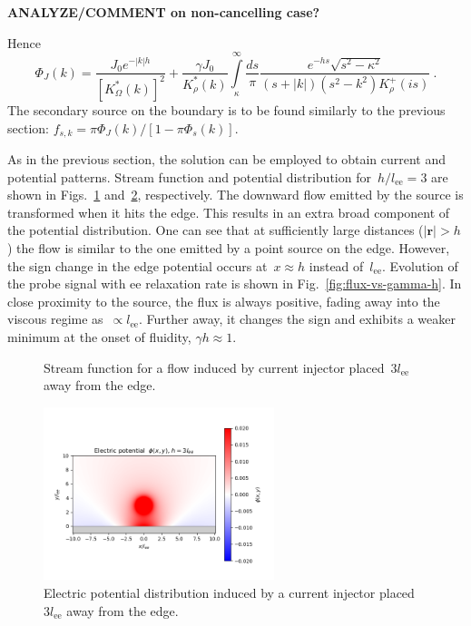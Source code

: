 \documentclass[preprint,aps,eqsecnum]{revtex4-1}
\newcommand{\fplus}[1]{{#1}^{+}}
\begin{document}
{\bf ANALYZE/COMMENT on non-cancelling case?}

Hence
\begin{equation}
\Phi_J(k) =
 \frac{J_0 e^{-|k|h}}{\left[K_\Omega^\ast(k)\right]^2}
 + \frac{\gamma J_0}{K_\rho^\ast(k)}
   \int\limits_{\kappa}^{\infty} \frac{ds}{\pi}
   \frac{e^{-hs} \sqrt{s^2 - \kappa^2}}{(s + |k|) (s^2 - k^2) \fplus{K}_\rho(is)}
   \ .
\end{equation}
The secondary source on the boundary is to be found similarly to the previous
section: $f_{s, k} = \pi \Phi_J(k)/\left[1 - \pi \Phi_s(k)\right]$.

As in the previous section, the solution can be employed to obtain current
and potential patterns. Stream function and potential distribution
for~$h/l_\mathrm{ee} = 3$ are shown in Figs.~\ref{fig:bulk-stream}
and~\ref{fig:bulk-rho}, respectively.
The downward flow emitted by the source is transformed
when it hits the edge. This results in an extra broad component of
the potential distribution.
One can see that at sufficiently large distances ($|{\bm r}| > h$) the flow
is similar to the one emitted by a point source on the edge. However,
the sign change in the edge potential occurs at~$x \approx h$
instead of~$l_\mathrm{ee}$.
Evolution of the probe signal with ee relaxation rate is shown in
Fig.~\ref{fig:flux-vs-gamma-h}. In close proximity to the source,
the flux is always positive, fading away into the viscous regime
as~$\propto l_\mathrm{ee}$. Further away, it changes the sign
and exhibits a weaker minimum at the onset of fluidity, $\gamma h \approx 1$.
\begin{figure}
  \def\svgwidth{0.5\textwidth}
  
  \caption{
    \label{fig:bulk-stream}
    Stream function for a flow induced by current injector
     placed~$3l_\mathrm{ee}$ away from the edge.
  }
\end{figure}
\begin{figure}
  \includegraphics[width=0.6\textwidth]{potential-h=3.png}
  \caption{
    \label{fig:bulk-rho}
    Electric  potential distribution induced by a current injector
    placed~$3l_\mathrm{ee}$ away from the edge.
  }
\end{figure}
\end{document}
